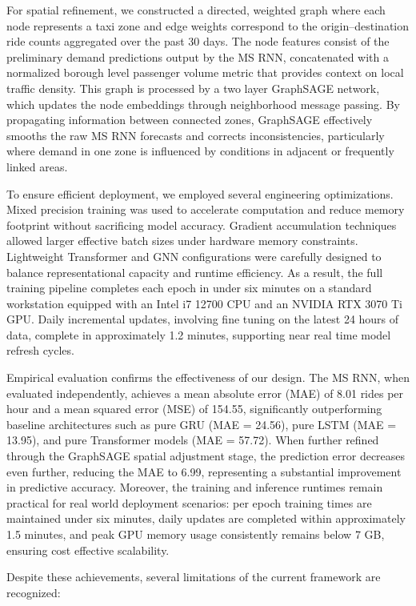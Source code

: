 \documentclass{article}
\begin{document}
For spatial refinement, we constructed a directed, weighted graph where each node represents a taxi zone and edge weights correspond to the origin–destination ride counts aggregated over the past 30 days. The node features consist of the preliminary demand predictions output by the MS RNN, concatenated with a normalized borough level passenger volume metric that provides context on local traffic density. This graph is processed by a two layer GraphSAGE network, which updates the node embeddings through neighborhood message passing. By propagating information between connected zones, GraphSAGE effectively smooths the raw MS RNN forecasts and corrects inconsistencies, particularly where demand in one zone is influenced by conditions in adjacent or frequently linked areas.

To ensure efficient deployment, we employed several engineering optimizations. Mixed precision training was used to accelerate computation and reduce memory footprint without sacrificing model accuracy. Gradient accumulation techniques allowed larger effective batch sizes under hardware memory constraints. Lightweight Transformer and GNN configurations were carefully designed to balance representational capacity and runtime efficiency. As a result, the full training pipeline completes each epoch in under six minutes on a standard workstation equipped with an Intel i7 12700 CPU and an NVIDIA RTX 3070 Ti GPU. Daily incremental updates, involving fine tuning on the latest 24 hours of data, complete in approximately 1.2 minutes, supporting near real time model refresh cycles.

Empirical evaluation confirms the effectiveness of our design. The MS RNN, when evaluated independently, achieves a mean absolute error (MAE) of 8.01 rides per hour and a mean squared error (MSE) of 154.55, significantly outperforming baseline architectures such as pure GRU (MAE = 24.56), pure LSTM (MAE = 13.95), and pure Transformer models (MAE = 57.72). When further refined through the GraphSAGE spatial adjustment stage, the prediction error decreases even further, reducing the MAE to 6.99, representing a substantial improvement in predictive accuracy. Moreover, the training and inference runtimes remain practical for real world deployment scenarios: per epoch training times are maintained under six minutes, daily updates are completed within approximately 1.5 minutes, and peak GPU memory usage consistently remains below 7 GB, ensuring cost effective scalability.

Despite these achievements, several limitations of the current framework are recognized:
\end{document}
